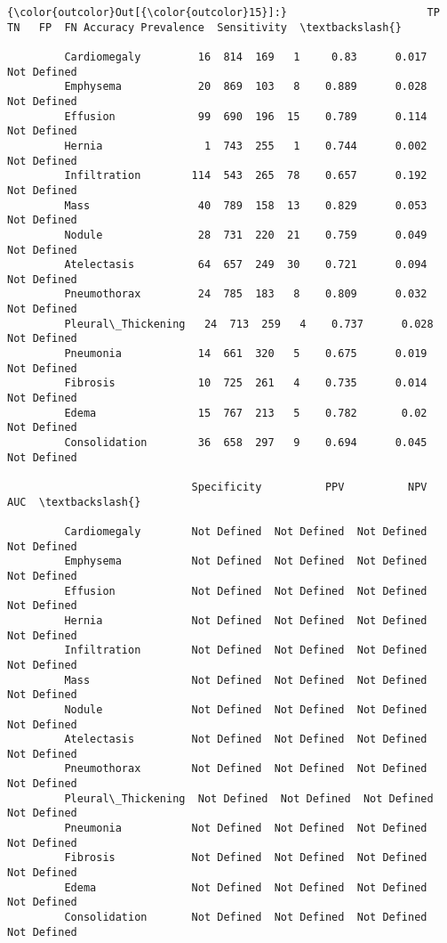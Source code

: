 \documentclass[11pt]{article}
\begin{document}
\begin{Verbatim}[commandchars=\\\{\}]
{\color{outcolor}Out[{\color{outcolor}15}]:}                      TP   TN   FP  FN Accuracy Prevalence  Sensitivity  \textbackslash{}
                                                                                  
         Cardiomegaly         16  814  169   1     0.83      0.017  Not Defined   
         Emphysema            20  869  103   8    0.889      0.028  Not Defined   
         Effusion             99  690  196  15    0.789      0.114  Not Defined   
         Hernia                1  743  255   1    0.744      0.002  Not Defined   
         Infiltration        114  543  265  78    0.657      0.192  Not Defined   
         Mass                 40  789  158  13    0.829      0.053  Not Defined   
         Nodule               28  731  220  21    0.759      0.049  Not Defined   
         Atelectasis          64  657  249  30    0.721      0.094  Not Defined   
         Pneumothorax         24  785  183   8    0.809      0.032  Not Defined   
         Pleural\_Thickening   24  713  259   4    0.737      0.028  Not Defined   
         Pneumonia            14  661  320   5    0.675      0.019  Not Defined   
         Fibrosis             10  725  261   4    0.735      0.014  Not Defined   
         Edema                15  767  213   5    0.782       0.02  Not Defined   
         Consolidation        36  658  297   9    0.694      0.045  Not Defined   
         
                             Specificity          PPV          NPV          AUC  \textbackslash{}
                                                                                  
         Cardiomegaly        Not Defined  Not Defined  Not Defined  Not Defined   
         Emphysema           Not Defined  Not Defined  Not Defined  Not Defined   
         Effusion            Not Defined  Not Defined  Not Defined  Not Defined   
         Hernia              Not Defined  Not Defined  Not Defined  Not Defined   
         Infiltration        Not Defined  Not Defined  Not Defined  Not Defined   
         Mass                Not Defined  Not Defined  Not Defined  Not Defined   
         Nodule              Not Defined  Not Defined  Not Defined  Not Defined   
         Atelectasis         Not Defined  Not Defined  Not Defined  Not Defined   
         Pneumothorax        Not Defined  Not Defined  Not Defined  Not Defined   
         Pleural\_Thickening  Not Defined  Not Defined  Not Defined  Not Defined   
         Pneumonia           Not Defined  Not Defined  Not Defined  Not Defined   
         Fibrosis            Not Defined  Not Defined  Not Defined  Not Defined   
         Edema               Not Defined  Not Defined  Not Defined  Not Defined   
         Consolidation       Not Defined  Not Defined  Not Defined  Not Defined   
         

\end{Verbatim}
\end{document}
